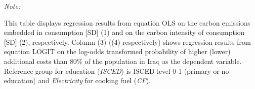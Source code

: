 \begin{table}[htbp!]
\begin{adjustbox}{width = 1\textwidth, max height = 0.95\textheight, center}
\begin{threeparttable}[b]
         \begin{tablenotes}\item \medskip \textit{Note:}
            \item This table displays regression results from equation OLS on the carbon emissions embedded in consumption [SD] (1) and on the carbon intensity of consumption [SD] (2), respectively. 
                                      Column (3) ((4) respectively) shows regression results from equation LOGIT on the log-odds transformed probability of higher (lower) additional costs than 80\% of the population in Iraq as the dependent variable. Reference group for education (\textit{ISCED}) is ISCED-level 0-1 (primary or no education) and \textit{Electricity} for cooking fuel (\textit{CF}).
         \end{tablenotes}
      \end{threeparttable}
   \end{adjustbox}
\end{table}


